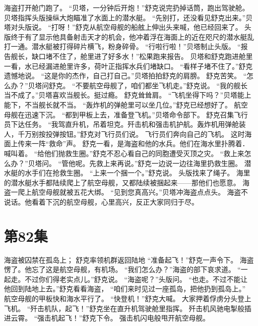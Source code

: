\documentclass[a4paper,12pt,UTF8,twoside]{ctexbook}
\begin{document}
        海盗打开舱门跑了。 
        “贝塔，一分钟后开炮！”舒克说完扔掉话筒，跑出驾驶舱。 
        贝塔指挥头版操纵大炮瞄准了水面上的潜水艇。 
        “先别打，还没看见舒克出来。”贝塔对头版说。 
        “打呀！”舒克从航空母舰的船舷上伸出头来喊，他已经回来了。 
        头版终于有了显示他具备射击天才的机会，他冲着浮在海面上的近在咫尺的潜水艇乱打一通。潜水艇被打得碎片横飞，粉身碎骨。 
        “行啦行啦！”贝塔制止头版。 
        “报告舰长，缺口堵不住了，舱里进了好多水！”松果跑来报告。 
        贝塔和舒克跑进舱里一看，水已经漏进舱里许多，荷叶正指挥水兵们堵缺口。 
        “看样子堵不住了。”舒克遗憾地说。 
        “这是你的杰作，自己打自己。”贝塔拍拍舒克的肩膀。 
        舒克苦笑。 
        “怎么办？”贝塔问舒克。 
        “不要航空母舰了，咱们都坐飞机走。”舒克说。 
        “我的舰长当不成了。”贝塔喜欢当舰长。挺过瘾。 
        舒克耸耸肩。 
        “飞机坐得下吗？”贝塔能上能下，不当舰长就不当。 
        “轰炸机的弹舱里可以坐几位。”舒克已经想好了。 
        航空母舰在迅速下沉。 
        “都到甲板上去，准备登飞机。”贝塔命令部下。 
        舒克召集飞行员下达任务。 
        “我驾直升机，吊着坦克。歼击机和强击机护航。轰炸机用弹舱装人，千万别按投弹按钮。”舒克对飞行员们说。 
        飞行员们奔向自己的飞机。 
        这时海面上传来一阵“救命”声。 
        舒克一看，是海盗和他的水兵。他们在海水里扑腾着．喊叫着。 
        “给他们抛救生圈。”舒克不忍心看自己的同胞遭受灭顶之灾。 
        “救上来怎么办？”贝塔问。 
        “管他呢。先救上来再说。”舒克一边说一边往海里扔救生圈。 
        潜水艇的水手们在抢救生圈。 
        “上来一个捆一个。”舒克说。 
       头版找来了绳子。 
       海里的潜水艇水手都陆续爬上了航空母舰，又都陆续被捆起来——那他们也愿意。 
        海盗一爬上航空母舰就被五花大绑。 
        “见到您真高兴。”贝塔冲海盗点点头。 
        海盗不说话。他看着下沉的航空母舰，心里高兴，反正大家同归于尽。   \chapter{第82集} 
        海盗被囚禁在孤岛上； 
        舒克率领机群返回陆地   
        “准备起飞！”舒克一声令下。 
        海盗愣了。他忘了这是航空母舰，有机场。 
        “我们怎么办？”海盗的部下哀求道。 
        “一起走。不过你们得老实点儿。”舒克说。 
        “海盗呢？”头版问。 
        “也走。不过不能让他回到陆地上去。”舒克看看海盗，  “咱们来时见过一座孤岛，把他扔到孤岛上。” 
        航空母舰的甲板快和海水平行了。 
        “快登机！”舒克大喊。 
        大家押着俘虏分头登上飞机。 
        “歼击机队，起飞！”舒克坐在直升机驾驶舱里指挥。 
        歼击机风驰电掣般插进云霄。 
        “强击机起飞！”舒克下令。 
        强击机闪电般甩开航空母舰。 
\end{document}

